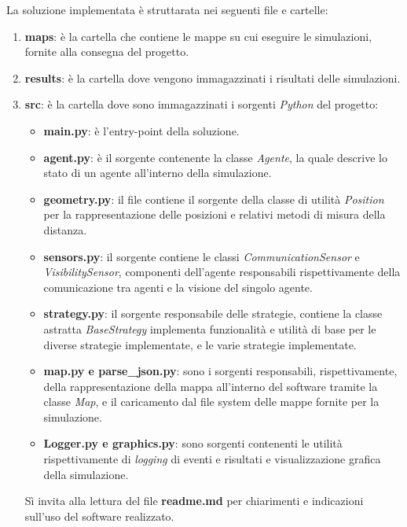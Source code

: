 \documentclass[11pt,a4paper]{article}
\begin{document}
\noindent
La soluzione implementata è struttarata nei seguenti file e cartelle:
\begin{enumerate}
    \item \textbf{maps}: è la cartella che contiene le mappe su cui eseguire le simulazioni, fornite alla consegna del progetto.
    \item \textbf{results}: è la cartella dove vengono immagazzinati i risultati delle simulazioni.
    \item \textbf{src}: è la cartella dove sono immagazzinati i sorgenti \textit{Python} del progetto:
    \begin{itemize}
        \item \textbf{main.py}: è l'entry-point della soluzione.
        \item \textbf{agent.py}: è il sorgente contenente la classe \textit{Agente}, la quale descrive lo stato di un agente all'interno della simulazione.
        \item \textbf{geometry.py}: il file contiene il sorgente della classe di utilità \textit{Position} per la rappresentazione delle posizioni e relativi metodi di misura della distanza.
        \item \textbf{sensors.py}: il sorgente contiene le classi \textit{CommunicationSensor} e \textit{VisibilitySensor}, componenti dell'agente responsabili rispettivamente della comunicazione tra agenti e la visione del singolo agente.
        \item \textbf{strategy.py}: il sorgente responsabile delle strategie, contiene la classe astratta \textit{BaseStrategy} implementa funzionalità e utilità di base per le diverse strategie implementate, e le varie strategie implementate.
        \item \textbf{map.py e parse\_json.py}: sono i sorgenti responsabili, rispettivamente, della rappresentazione della mappa all'interno del software tramite la classe \textit{Map}, e il caricamento dal file system delle mappe fornite per la simulazione.
        \item \textbf{Logger.py e graphics.py}: sono sorgenti contenenti le utilità rispettivamente di \textit{logging} di eventi e risultati e visualizzazione grafica della simulazione.
    \end{itemize}

Sì invita alla lettura del file \textbf{readme.md} per chiarimenti e indicazioni sull'uso del software realizzato.
\end{enumerate}
\end{document}
